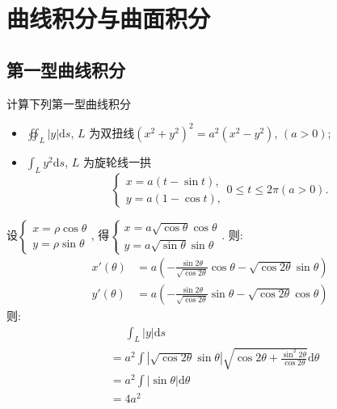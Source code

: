 \chapter{曲线积分与曲面积分}
\section{第一型曲线积分}
\begin{problem}
    计算下列第一型曲线积分
    \begin{itemize}
        \item \(\displaystyle\oiint_{L}|y|\mathrm{d}s\), \(L\)
            为双扭线\((x^2 + y^2)^2 = a^2
            (x^2 - y^2)\), \((a > 0)\);
        \item \(\int_{L} y^2 \mathrm{d}s\), \(L\) 为旋轮线一拱
            \[
                \begin{cases}
                    x = a(t - \sin t), \\
                    y = a(1 - \cos t),
                \end{cases}  0 \leq t \leq 2\pi (a > 0).
            \]
    \end{itemize}

\end{problem}

\begin{solution}
    设\(
        \begin{cases}
            x = \rho \cos \theta \\
            y = \rho \sin \theta
    \end{cases}\), 得\(
        \begin{cases}
            x = a \sqrt{\cos \theta}\cos \theta \\
            y = a \sqrt{\sin \theta}\sin \theta
    \end{cases}\). 则:
    \begin{align*}
        x'(\theta) &= a \left( - \frac{\sin 2\theta}{\sqrt{\cos
        2\theta}} \cos\theta - \sqrt{\cos2\theta} \sin\theta \right)\\
        y'(\theta) &= a \left( - \frac{\sin 2\theta}{\sqrt{\cos
        2\theta}} \sin\theta - \sqrt{\cos2\theta} \cos\theta \right)
    \end{align*}
    则:
    \begin{align*}
        &\mathrel{\phantom{=}} \int_{L} \left| y \right| \mathrm{d}s \\
        &= a^{2} \int \left| \sqrt{\cos2\theta}\sin\theta
        \right|\sqrt{\cos2\theta +
        \frac{\sin^{2}2\theta}{\cos2\theta}} \mathrm{d}\theta \\
        &= a^{2}\int \left| \sin\theta \right|  \mathrm{d}\theta \\
        &= 4a^{2}
    \end{align*}
\end{solution}

